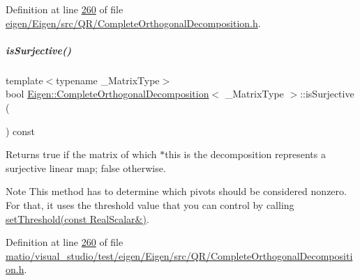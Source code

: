 Definition at line \hyperlink{eigen_2_eigen_2src_2_q_r_2_complete_orthogonal_decomposition_8h_source_l00260}{260} of file \hyperlink{eigen_2_eigen_2src_2_q_r_2_complete_orthogonal_decomposition_8h_source}{eigen/\+Eigen/src/\+Q\+R/\+Complete\+Orthogonal\+Decomposition.\+h}.

\mbox{\label{group___q_r___module_a53dd287d3e1bbc548595d63880fd51bf}} 
\subparagraph{\texorpdfstring{is\+Surjective()}{isSurjective()}\hspace{0.1cm}{\footnotesize\ttfamily [2/2]}}
{\footnotesize\ttfamily template$<$typename \+\_\+\+Matrix\+Type$>$ \\
bool \hyperlink{group___q_r___module_class_eigen_1_1_complete_orthogonal_decomposition}{Eigen\+::\+Complete\+Orthogonal\+Decomposition}$<$ \+\_\+\+Matrix\+Type $>$\+::is\+Surjective (\begin{DoxyParamCaption}{ }\end{DoxyParamCaption}) const\hspace{0.3cm}{\ttfamily [inline]}}

\begin{DoxyReturn}{Returns}
true if the matrix of which $\ast$this is the decomposition represents a surjective linear map; false otherwise.
\end{DoxyReturn}
\begin{DoxyNote}{Note}
This method has to determine which pivots should be considered nonzero. For that, it uses the threshold value that you can control by calling \hyperlink{group___q_r___module_aa9c9f7cbde9d58ca5552381b70ad8d82}{set\+Threshold(const Real\+Scalar\&)}. 
\end{DoxyNote}


Definition at line \hyperlink{matio_2visual__studio_2test_2eigen_2_eigen_2src_2_q_r_2_complete_orthogonal_decomposition_8h_source_l00260}{260} of file \hyperlink{matio_2visual__studio_2test_2eigen_2_eigen_2src_2_q_r_2_complete_orthogonal_decomposition_8h_source}{matio/visual\+\_\+studio/test/eigen/\+Eigen/src/\+Q\+R/\+Complete\+Orthogonal\+Decomposition.\+h}.

